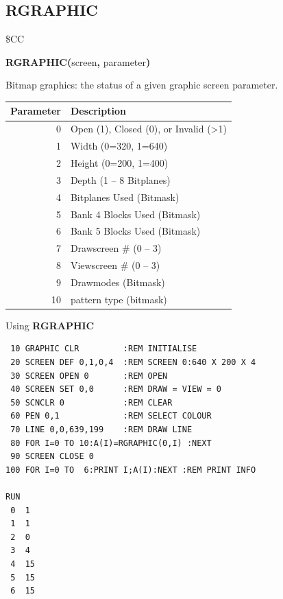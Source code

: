 \subsection{RGRAPHIC}
\begin{description}[leftmargin=2cm,style=nextline]
\item [Token:] \$CC
\item [Format:] {\bf RGRAPHIC(}screen{\bf,} parameter{\bf)}
\item [Returns:]  Bitmap graphics: the status of a given graphic screen parameter.

\begin{center}
{\setlength{\tabcolsep}{1mm}
\begin{tabular}{|r|l|}
\hline
{\bf Parameter}  & {\bf Description} \\
\hline
0  & Open   (1), Closed (0), or Invalid (>1)  \\
1  & Width  (0=320, 1=640)  \\
2  & Height (0=200, 1=400)  \\
3  & Depth (1 -- 8 Bitplanes)  \\
4  & Bitplanes Used  (Bitmask)  \\
5  & Bank 4 Blocks Used (Bitmask)  \\
6  & Bank 5 Blocks Used (Bitmask)  \\
7  & Drawscreen \# (0 -- 3)  \\
8  & Viewscreen \# (0 -- 3)  \\
9  & Drawmodes  (Bitmask)  \\
10 & pattern type  (bitmask)  \\
\hline
\end{tabular}
}
\end{center}

\item [Example:] Using {\bf RGRAPHIC}

\begin{tcolorbox}[colback=black,coltext=white]
\verbatimfont{\codefont}
\begin{verbatim}
 10 GRAPHIC CLR         :REM INITIALISE
 20 SCREEN DEF 0,1,0,4  :REM SCREEN 0:640 X 200 X 4
 30 SCREEN OPEN 0       :REM OPEN
 40 SCREEN SET 0,0      :REM DRAW = VIEW = 0
 50 SCNCLR 0            :REM CLEAR
 60 PEN 0,1             :REM SELECT COLOUR
 70 LINE 0,0,639,199    :REM DRAW LINE
 80 FOR I=0 TO 10:A(I)=RGRAPHIC(0,I) :NEXT
 90 SCREEN CLOSE 0
100 FOR I=0 TO  6:PRINT I;A(I):NEXT :REM PRINT INFO

RUN
 0  1
 1  1
 2  0
 3  4
 4  15
 5  15
 6  15
\end{verbatim}
\end{tcolorbox}
\end{description}


